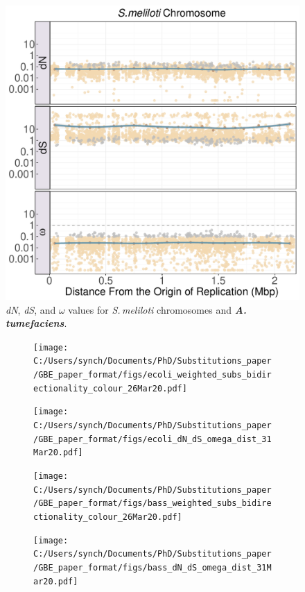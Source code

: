 \documentclass[12pt]{article}
\newcommand{\smel}{\textit{S.\,meliloti}\xspace}
\newcommand{\agro}{\textit{A.\,tumefaciens}\xspace}
\newcommand{\dn}{\textit{dN}\xspace}
\newcommand{\ds}{\textit{dS}\xspace}
\begin{document}
\begin{figure}
	\includegraphics[width=0.9\linewidth]{./dN_dS_omega_dist.pdf}
	\caption{\label{fig:sinoC_agro_selection} \dn, \ds, and $\omega$ values for \smel chromosomes and \textbf{\agro}.}
\end{figure}

\begin{figure}
	\centering
	\begin{subfigure}{.5\textwidth}
		\centering
		\texttt{[image: C:/Users/synch/Documents/PhD/Substitutions\_paper/GBE\_paper\_format/figs/ecoli\_weighted\_subs\_bidirectionality\_colour\_26Mar20.pdf]}
		\caption{}
		\label{fig:e1}
	\end{subfigure}%
	\begin{subfigure}{.5\textwidth}
		\centering
		\texttt{[image: C:/Users/synch/Documents/PhD/Substitutions\_paper/GBE\_paper\_format/figs/ecoli\_dN\_dS\_omega\_dist\_31Mar20.pdf]}
		\caption{}
		\label{fig:e2}
	\end{subfigure}
	\label{fig:ecoli}
\end{figure}

\begin{figure}
	\centering
	\begin{subfigure}{.5\textwidth}
		\centering
		\texttt{[image: C:/Users/synch/Documents/PhD/Substitutions\_paper/GBE\_paper\_format/figs/bass\_weighted\_subs\_bidirectionality\_colour\_26Mar20.pdf]}
		\caption{}
		\label{fig:b1}
	\end{subfigure}%
	\begin{subfigure}{.5\textwidth}
		\centering
		\texttt{[image: C:/Users/synch/Documents/PhD/Substitutions\_paper/GBE\_paper\_format/figs/bass\_dN\_dS\_omega\_dist\_31Mar20.pdf]}
		\caption{}
		\label{fig:b2}
	\end{subfigure}
	\label{fig:bass}
\end{figure}
\end{document}
